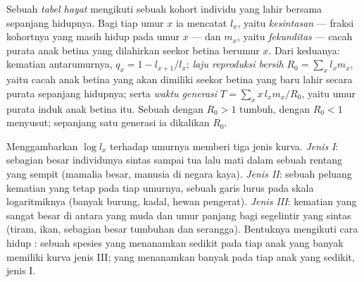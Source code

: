 \begin{definition}\label{def:b1:populations:lifetable}
Sebuah \emph{tabel hayat} mengikuti sebuah kohort individu yang lahir
bersama sepanjang hidupnya. Bagi tiap umur $x$ ia mencatat $l_x$,
yaitu \emph{kesintasan} --- fraksi kohortnya yang masih hidup pada umur
$x$ --- dan $m_x$, yaitu \emph{fekunditas} --- cacah purata anak betina
yang dilahirkan seekor betina berumur $x$. Dari keduanya: kematian
antarumurnya, $q_x = 1 - l_{x+1}/l_x$; \emph{laju reproduksi
bersih} $R_0 = \sum_x l_x m_x$, yaitu cacah anak betina yang akan
dimiliki seekor betina yang baru lahir secara purata sepanjang
hidupnya; serta \emph{waktu generasi}
$T = \sum_x x\,l_x m_x / R_0$, yaitu umur purata induk anak betina itu.
Sebuah  dengan $R_0 > 1$ tumbuh, dengan $R_0 < 1$
menyusut; sepanjang satu generasi ia dikalikan $R_0$.
\end{definition}

\begin{proposition}\label{prop:b1:populations:survivorship}
Menggambarkan $\log l_x$ terhadap umurnya memberi tiga jenis kurva.
\emph{Jenis I}: sebagian besar individunya sintas sampai tua lalu mati
dalam sebuah rentang yang sempit (mamalia besar, manusia di negara
kaya). \emph{Jenis II}: sebuah peluang kematian yang tetap pada tiap
umurnya, sebuah garis lurus pada skala logaritmiknya (banyak burung,
kadal, hewan pengerat). \emph{Jenis III}: kematian yang sangat besar di
antara yang muda dan umur panjang bagi segelintir yang sintas (tiram,
ikan, sebagian besar tumbuhan dan serangga). Bentuknya mengikuti cara
hidup : sebuah spesies yang menanamkan sedikit pada tiap
anak yang banyak memiliki kurva jenis III; yang menanamkan banyak pada
tiap anak yang sedikit, jenis I.
\end{proposition}

